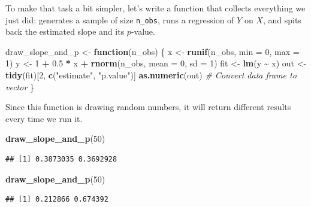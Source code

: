 \documentclass[
  12pt,
  oneside,openany]{book}
\newenvironment{Shaded}{\begin{snugshade}}{\end{snugshade}}
\newcommand{\CommentTok}[1]{\textcolor[rgb]{0.56,0.35,0.01}{\textit{#1}}}
\newcommand{\ControlFlowTok}[1]{\textcolor[rgb]{0.13,0.29,0.53}{\textbf{#1}}}
\newcommand{\DataTypeTok}[1]{\textcolor[rgb]{0.13,0.29,0.53}{#1}}
\newcommand{\DecValTok}[1]{\textcolor[rgb]{0.00,0.00,0.81}{#1}}
\newcommand{\FloatTok}[1]{\textcolor[rgb]{0.00,0.00,0.81}{#1}}
\newcommand{\KeywordTok}[1]{\textcolor[rgb]{0.13,0.29,0.53}{\textbf{#1}}}
\newcommand{\NormalTok}[1]{#1}
\newcommand{\OperatorTok}[1]{\textcolor[rgb]{0.81,0.36,0.00}{\textbf{#1}}}
\newcommand{\StringTok}[1]{\textcolor[rgb]{0.31,0.60,0.02}{#1}}
\begin{document}
To make that task a bit simpler, let's write a function that collects everything we just did: generates a sample of size \texttt{n\_obs}, runs a regression of \(Y\) on \(X\), and spits back the estimated slope and its \(p\)-value.

\begin{Shaded}
\begin{Highlighting}[]
\NormalTok{draw\_slope\_and\_p <{-}}\StringTok{ }\ControlFlowTok{function}\NormalTok{(n\_obs) \{}
\NormalTok{    x <{-}}\StringTok{ }\KeywordTok{runif}\NormalTok{(n\_obs, }\DataTypeTok{min =} \DecValTok{0}\NormalTok{, }\DataTypeTok{max =} \DecValTok{1}\NormalTok{)}
\NormalTok{    y <{-}}\StringTok{ }\DecValTok{1} \OperatorTok{+}\StringTok{ }\FloatTok{0.5} \OperatorTok{*}\StringTok{ }\NormalTok{x }\OperatorTok{+}\StringTok{ }\KeywordTok{rnorm}\NormalTok{(n\_obs, }\DataTypeTok{mean =} \DecValTok{0}\NormalTok{, }\DataTypeTok{sd =} \DecValTok{1}\NormalTok{)}
\NormalTok{    fit <{-}}\StringTok{ }\KeywordTok{lm}\NormalTok{(y }\OperatorTok{\textasciitilde{}}\StringTok{ }\NormalTok{x)}
\NormalTok{    out <{-}}\StringTok{ }\KeywordTok{tidy}\NormalTok{(fit)[}\DecValTok{2}\NormalTok{, }\KeywordTok{c}\NormalTok{(}\StringTok{"estimate"}\NormalTok{, }\StringTok{"p.value"}\NormalTok{)]}
    \KeywordTok{as.numeric}\NormalTok{(out)  }\CommentTok{\# Convert data frame to vector}
\NormalTok{\}}
\end{Highlighting}
\end{Shaded}

Since this function is drawing random numbers, it will return different results every time we run it.

\begin{Shaded}
\begin{Highlighting}[]
\KeywordTok{draw\_slope\_and\_p}\NormalTok{(}\DecValTok{50}\NormalTok{)}
\end{Highlighting}
\end{Shaded}

\begin{verbatim}
## [1] 0.3873035 0.3692928
\end{verbatim}

\begin{Shaded}
\begin{Highlighting}[]
\KeywordTok{draw\_slope\_and\_p}\NormalTok{(}\DecValTok{50}\NormalTok{)}
\end{Highlighting}
\end{Shaded}

\begin{verbatim}
## [1] 0.212866 0.674392
\end{verbatim}
\end{document}
